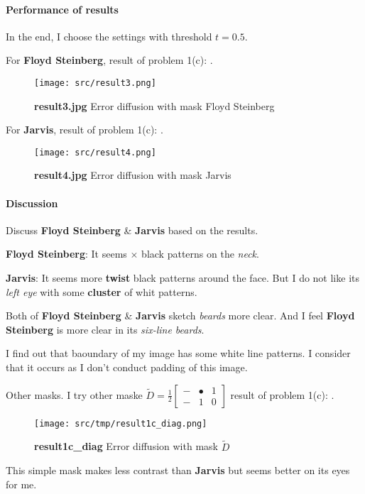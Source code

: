 \paragraph{Performance of results}
In the end, I choose the settings with threshold \(t = 0.5\).

For \textbf{Floyd Steinberg},
result of problem 1(c): .
\begin{figure}
    \centering
    \texttt{[image: src/result3.png]}
    \caption{\textbf{result3.jpg} Error diffusion with mask Floyd Steinberg}
    \label{result3}
\end{figure}

For \textbf{Jarvis},
result of problem 1(c): .
\begin{figure}
    \centering
    \texttt{[image: src/result4.png]}
    \caption{\textbf{result4.jpg} Error diffusion with mask Jarvis}
    \label{result4}
\end{figure}

\paragraph{Discussion}
Discuss \textbf{Floyd Steinberg} \& \textbf{Jarvis} based on the results.

\textbf{Floyd Steinberg}: It seems \(\times\) black patterns on the \textit{neck}.

\textbf{Jarvis}: It seems more \textbf{twist} black patterns around the face. But I do not like its \textit{left eye} with some \textbf{cluster} of whit patterns.

Both of \textbf{Floyd Steinberg} \& \textbf{Jarvis} sketch \textit{beards} more clear. And I feel \textbf{Floyd Steinberg} is more clear in its \textit{six-line beards}.

I find out that baoundary of my image has some white line patterns. I consider that it occurs as I don't conduct padding of this image.

Other masks.
I try other maske 
\(
\tilde{D} = \frac{1}{2}
\begin{bmatrix}
    - & \bullet & 1\\
    - & 1  & 0
\end{bmatrix}
\) 
result of problem 1(c): .
\begin{figure}
    \centering
    \texttt{[image: src/tmp/result1c\_diag.png]}
    \caption{\textbf{result1c\_diag} Error diffusion with mask \(\tilde{D}\)}
    \label{result1c_diag}
\end{figure}
This simple mask makes less contrast than \textbf{Jarvis} but seems better on its eyes for me.

